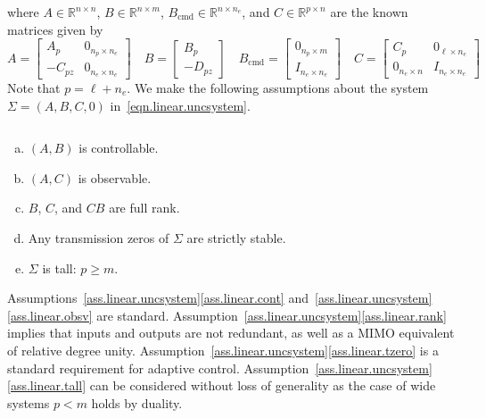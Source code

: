 where $A\in\mathbb{R}^{n\times n}$, $B\in\mathbb{R}^{n\times m}$, $B_{\text{cmd}}\in\mathbb{R}^{n\times n_{e}}$, and $C\in\mathbb{R}^{p\times n}$ are the known matrices given by
\begin{equation*}
  A=
  \begin{bmatrix}
    A_{p} & 0_{n_{p}\times n_{e}} \\
    -C_{pz} & 0_{n_{e}\times n_{e}}
  \end{bmatrix} \quad
  B=
  \begin{bmatrix}
    B_{p} \\
    -D_{pz}
  \end{bmatrix}
  \quad
  B_{\text{cmd}}=
  \begin{bmatrix}
    0_{n_{p}\times m} \\
    I_{n_{e}\times n_{e}}
  \end{bmatrix}
  \quad
  C=
  \begin{bmatrix}
    C_{p} & 0_{\ell\times n_{e}} \\
    0_{n_{e}\times n} & I_{n_{e}\times n_{e}}
  \end{bmatrix}
\end{equation*}
Note that $p=\ell+n_{e}$.
We make the following assumptions about the system $\Sigma=(A,B,C,0)$ in~\eqref{eqn.linear.uncsystem}.

\begin{ass-dan} $\;$\label{ass.linear.uncsystem}
  \begin{enumerate}[a)] %
    \setlength{\itemindent}{0.25in}
    \itemsep0em
    \item{$(A,B)$ is controllable.\label{ass.linear.cont}}
    \item{$(A,C)$ is observable.\label{ass.linear.obsv}}
    \item{$B$, $C$, and $CB$ are full rank.\label{ass.linear.rank}}
    \item{Any transmission zeros of $\Sigma$ are strictly stable.\label{ass.linear.tzero}}
    \item{$\Sigma$ is tall: $p\geq m$.\label{ass.linear.tall}}
  \end{enumerate}
\end{ass-dan}

\begin{rem-dan}
  Assumptions~\ref{ass.linear.uncsystem}\ref{ass.linear.cont} and~\ref{ass.linear.uncsystem}\ref{ass.linear.obsv} are standard.
  Assumption~\ref{ass.linear.uncsystem}\ref{ass.linear.rank} implies that inputs and outputs are not redundant, as well as a MIMO equivalent of relative degree unity.
  Assumption~\ref{ass.linear.uncsystem}\ref{ass.linear.tzero} is a standard requirement for adaptive control.
  Assumption~\ref{ass.linear.uncsystem}\ref{ass.linear.tall} can be considered without loss of generality as the case of wide systems $p<m$ holds by duality.
\end{rem-dan}

